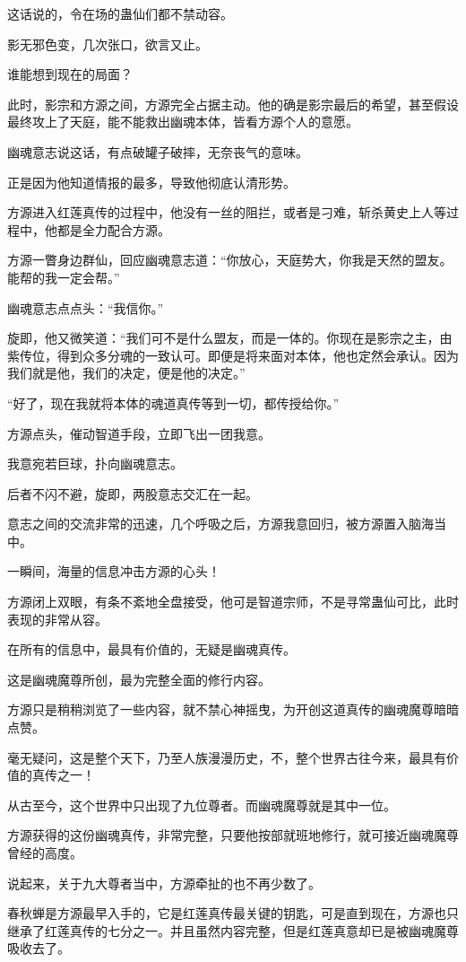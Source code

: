\begin{this_body}
这话说的，令在场的蛊仙们都不禁动容。

影无邪色变，几次张口，欲言又止。

谁能想到现在的局面？

此时，影宗和方源之间，方源完全占据主动。他的确是影宗最后的希望，甚至假设最终攻上了天庭，能不能救出幽魂本体，皆看方源个人的意愿。

幽魂意志说这话，有点破罐子破摔，无奈丧气的意味。

正是因为他知道情报的最多，导致他彻底认清形势。

方源进入红莲真传的过程中，他没有一丝的阻拦，或者是刁难，斩杀黄史上人等过程中，他都是全力配合方源。

方源一瞥身边群仙，回应幽魂意志道：“你放心，天庭势大，你我是天然的盟友。能帮的我一定会帮。”

幽魂意志点点头：“我信你。”

旋即，他又微笑道：“我们可不是什么盟友，而是一体的。你现在是影宗之主，由紫传位，得到众多分魂的一致认可。即便是将来面对本体，他也定然会承认。因为我们就是他，我们的决定，便是他的决定。”

“好了，现在我就将本体的魂道真传等到一切，都传授给你。”

方源点头，催动智道手段，立即飞出一团我意。

我意宛若巨球，扑向幽魂意志。

后者不闪不避，旋即，两股意志交汇在一起。

意志之间的交流非常的迅速，几个呼吸之后，方源我意回归，被方源置入脑海当中。

一瞬间，海量的信息冲击方源的心头！

方源闭上双眼，有条不紊地全盘接受，他可是智道宗师，不是寻常蛊仙可比，此时表现的非常从容。

在所有的信息中，最具有价值的，无疑是幽魂真传。

这是幽魂魔尊所创，最为完整全面的修行内容。

方源只是稍稍浏览了一些内容，就不禁心神摇曳，为开创这道真传的幽魂魔尊暗暗点赞。

毫无疑问，这是整个天下，乃至人族漫漫历史，不，整个世界古往今来，最具有价值的真传之一！

从古至今，这个世界中只出现了九位尊者。而幽魂魔尊就是其中一位。

方源获得的这份幽魂真传，非常完整，只要他按部就班地修行，就可接近幽魂魔尊曾经的高度。

说起来，关于九大尊者当中，方源牵扯的也不再少数了。

春秋蝉是方源最早入手的，它是红莲真传最关键的钥匙，可是直到现在，方源也只继承了红莲真传的七分之一。并且虽然内容完整，但是红莲真意却已是被幽魂魔尊吸收去了。


\end{this_body}
